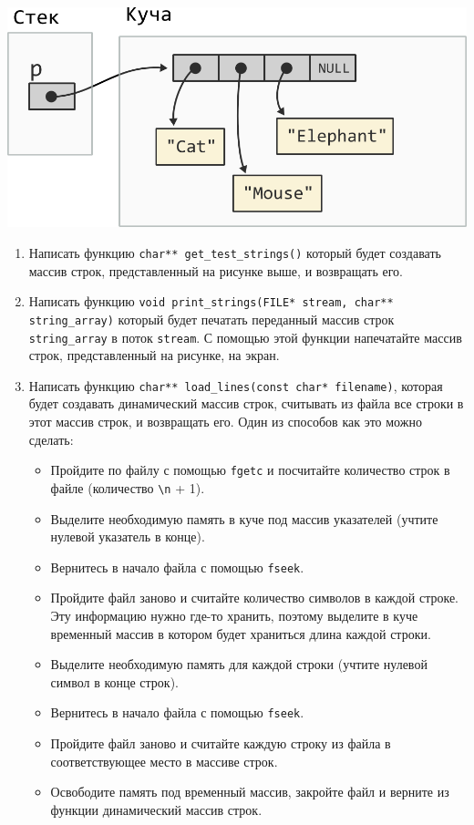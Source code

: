 \documentclass[10pt]{article}
\begin{document}
\begin{center}
\includegraphics[scale=0.8]{../images/malloc_homework/12string_array_heap.png}
\end{center}

\begin{enumerate}
\item Написать функцию \texttt{char** get\_test\_strings()} который будет создавать массив строк, представленный на рисунке выше, и возвращать его.

\item Написать функцию \texttt{void print\_strings(FILE* stream, char** string\_array)} который будет печатать переданный массив строк \texttt{string\_array} в поток \texttt{stream}. С помощью этой функции напечатайте массив строк, представленный на рисунке, на экран.

\item Написать функцию \texttt{char** load\_lines(const char* filename)},
которая будет создавать динамический массив строк, считывать из файла все строки в этот массив строк, и возвращать его. Один из способов как это можно сделать:
\begin{itemize}
\item Пройдите по файлу с помощью \texttt{fgetc} и посчитайте количество строк в файле (количество \texttt{\textbackslash n} + 1).
\item Выделите необходимую память в куче под массив указателей (учтите нулевой указатель в конце).
\item Вернитесь в начало файла с помощью \texttt{fseek}.
\item Пройдите файл заново и считайте количество символов в каждой строке. Эту информацию нужно где-то хранить, поэтому выделите в куче временный массив в котором будет храниться длина каждой строки.
\item Выделите необходимую память для каждой строки (учтите нулевой символ в конце строк).
\item Вернитесь в начало файла с помощью \texttt{fseek}.
\item Пройдите файл заново и считайте каждую строку из файла в соответствующее место в массиве строк.
\item Освободите память под временный массив, закройте файл и верните из функции динамический массив строк.
\end{itemize}


\end{enumerate}
\end{document}
